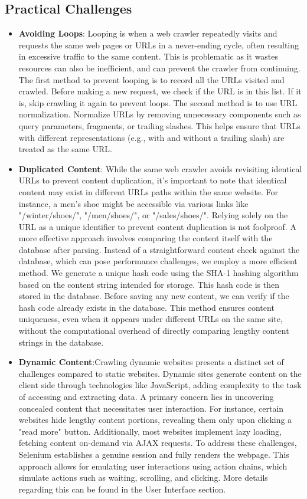 \subsection{Practical Challenges}
\begin{itemize}
  \item \textbf{Avoiding Loops}: Looping is when a web crawler repeatedly visits and requests the same web pages or URLs in a never-ending cycle, often resulting in excessive traffic to the same content. This is problematic as it wastes resources can also be inefficient, and can prevent the crawler from continuing. The first method to prevent looping is to record all the URLs visited and crawled. Before making a new request, we check if the URL is in this list. If it is, skip crawling it again to prevent loops. The second method is to use URL normalization. Normalize URLs by removing unnecessary components such as query parameters, fragments, or trailing slashes. This helps ensure that URLs with different representations (e.g., with and without a trailing slash) are treated as the same URL.


\item  \textbf{Duplicated Content}: While the same web crawler avoids revisiting identical URLs to prevent content duplication, it's important to note that identical content may exist in different URLs paths within the same website. For instance, a men's shoe might be accessible via various links like "/winter/shoes/", "/men/shoes/", or "/sales/shoes/". Relying solely on the URL as a unique identifier to prevent content duplication is not foolproof.
A more effective approach involves comparing the content itself with the database after parsing. Instead of a straightforward content check against the database, which can pose performance challenges, we employ a more efficient method. We generate a unique hash code using the SHA-1 hashing algorithm based on the content string intended for storage. This hash code is then stored in the database.
Before saving any new content, we can verify if the hash code already exists in the database. This method ensures content uniqueness, even when it appears under different URLs on the same site, without the computational overhead of directly comparing lengthy content strings in the database.

\item  \textbf{Dynamic Content}:Crawling dynamic websites presents a distinct set of challenges compared to static websites. Dynamic sites generate content on the client side through technologies like JavaScript, adding complexity to the task of accessing and extracting data. A primary concern lies in uncovering concealed content that necessitates user interaction. For instance, certain websites hide lengthy content portions, revealing them only upon clicking a "read more" button. Additionally, most websites implement lazy loading, fetching content on-demand via AJAX requests.
To address these challenges, Selenium establishes a genuine session and fully renders the webpage. This approach allows for emulating user interactions using action chains, which simulate actions such as waiting, scrolling, and clicking. More details regarding this can be found in the User Interface section.


\end{itemize}
